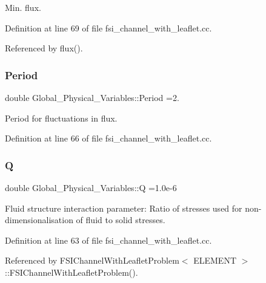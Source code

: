 Min. flux. 



Definition at line 69 of file fsi\+\_\+channel\+\_\+with\+\_\+leaflet.\+cc.



Referenced by flux().

\mbox{\label{namespaceGlobal__Physical__Variables_a2ffa220a56bff9b6b495ed47954d513f}} 
\subsubsection{\texorpdfstring{Period}{Period}}
{\footnotesize\ttfamily double Global\+\_\+\+Physical\+\_\+\+Variables\+::\+Period =2.}



Period for fluctuations in flux. 



Definition at line 66 of file fsi\+\_\+channel\+\_\+with\+\_\+leaflet.\+cc.

\mbox{\label{namespaceGlobal__Physical__Variables_a66cb7ecda9ba0cd72367dd697f154545}} 
\subsubsection{\texorpdfstring{Q}{Q}}
{\footnotesize\ttfamily double Global\+\_\+\+Physical\+\_\+\+Variables\+::Q =1.\+0e-\/6}



Fluid structure interaction parameter\+: Ratio of stresses used for non-\/dimensionalisation of fluid to solid stresses. 



Definition at line 63 of file fsi\+\_\+channel\+\_\+with\+\_\+leaflet.\+cc.



Referenced by F\+S\+I\+Channel\+With\+Leaflet\+Problem$<$ E\+L\+E\+M\+E\+N\+T $>$\+::\+F\+S\+I\+Channel\+With\+Leaflet\+Problem().

\mbox{\label{namespaceGlobal__Physical__Variables_ab814e627d2eb5bc50318879d19ab16b9}} 
